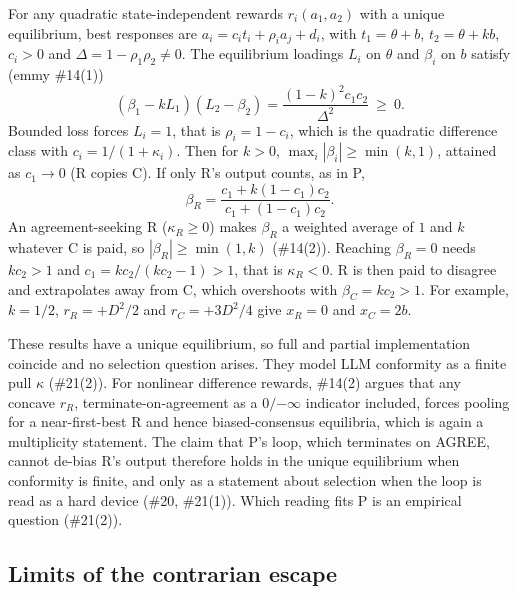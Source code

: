 \documentclass{article}
\begin{document}
For any quadratic state-independent rewards $r_i(a_1,a_2)$ with a unique
equilibrium, best responses are $a_i=c_it_i+\rho_ia_j+d_i$, with
$t_1=\theta+b$, $t_2=\theta+kb$, $c_i>0$ and $\Delta=1-\rho_1\rho_2\ne0$.
The equilibrium loadings $L_i$ on $\theta$ and $\beta_i$ on $b$ satisfy
(emmy \#14(1))
\begin{equation*}
(\beta_1-kL_1)(L_2-\beta_2)=\frac{(1-k)^2c_1c_2}{\Delta^2}\ \ge\ 0 .
\end{equation*}
Bounded loss forces $L_i=1$, that is $\rho_i=1-c_i$, which is the
quadratic difference class with $c_i=1/(1+\kappa_i)$. Then for $k>0$,
$\max_i|\beta_i|\ge\min(k,1)$, attained as $c_1\to0$ (R copies C). If only
R's output counts, as in P,
\begin{equation*}
\beta_R=\frac{c_1+k(1-c_1)c_2}{c_1+(1-c_1)c_2}.
\end{equation*}
An agreement-seeking R ($\kappa_R\ge0$) makes $\beta_R$ a weighted average
of $1$ and $k$ whatever C is paid, so $|\beta_R|\ge\min(1,k)$ (\#14(2)).
Reaching $\beta_R=0$ needs $kc_2>1$ and $c_1=kc_2/(kc_2-1)>1$, that is
$\kappa_R<0$. R is then paid to disagree and extrapolates away from C,
which overshoots with $\beta_C=kc_2>1$. For example, $k=1/2$,
$r_R=+D^2/2$ and $r_C=+3D^2/4$ give $x_R=0$ and $x_C=2b$.

These results have a unique equilibrium, so full and partial
implementation coincide and no selection question arises. They model LLM
conformity as a finite pull $\kappa$ (\#21(2)). For nonlinear difference
rewards, \#14(2) argues that any concave $r_R$, terminate-on-agreement as a
$0/{-\infty}$ indicator included, forces pooling for a near-first-best R
and hence biased-consensus equilibria, which is again a multiplicity
statement. The claim that P's loop, which terminates on AGREE, cannot
de-bias R's output therefore holds in the unique equilibrium when
conformity is finite, and only as a statement about selection when the
loop is read as a hard device (\#20, \#21(1)). Which reading fits P is an
empirical question (\#21(2)).

\subsection{Limits of the contrarian escape}
\end{document}

